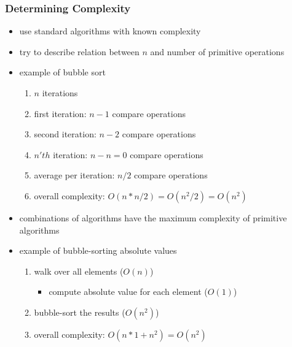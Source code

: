 \begin{frame}
 \frametitle{Determining Complexity}
 \begin{itemize}
  \item use standard algorithms with known complexity
 \end{itemize}


 \begin{itemize}
  \item try to describe relation between \( n \) and number of primitive operations
  \item example of bubble sort
  \begin{enumerate}
   \item \(n\) iterations
   \item first iteration: \( n-1 \) compare operations
   \item second iteration: \( n-2 \) compare operations
   \item \(n'th\) iteration: \( n-n = 0 \) compare operations
   \item average per iteration: \( n/2 \) compare operations
   \item overall complexity: \( O(n * n/2) = O(n^2 / 2) = O(n^2) \)
  \end{enumerate}
  \item combinations of algorithms have the maximum complexity of primitive algorithms
  \item example of bubble-sorting absolute values
  \begin{enumerate}
   \item walk over all elements (\( O(n) \))
   \begin{itemize}
    \item compute absolute value for each element (\( O(1) \))
   \end{itemize}
   \item bubble-sort the results (\( O(n^2) \))
   \item overall complexity: \( O(n*1 + n^2) = O(n^2) \)
  \end{enumerate}
 \end{itemize}
\end{frame}

